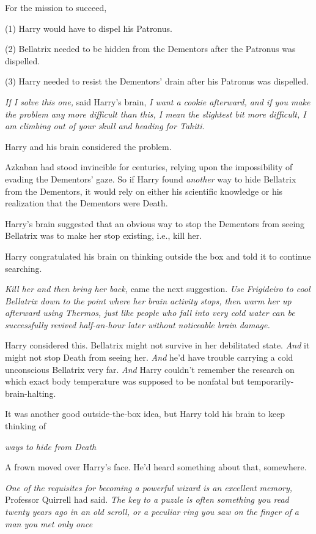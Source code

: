 For the mission to succeed,

(1) Harry would have to dispel his Patronus.

(2) Bellatrix needed to be hidden from the Dementors after the Patronus was
dispelled.

(3) Harry needed to resist the Dementors' drain after his Patronus was
dispelled.

{\el}

\emph{If I solve this one,} said Harry's brain, \emph{I want a cookie
afterward, and if you make the problem any more difficult than this, I mean the
slightest bit more difficult, I am climbing out of your skull and heading for
Tahiti.}

Harry and his brain considered the problem.

Azkaban had stood invincible for centuries, relying upon the impossibility of
evading the Dementors' gaze. So if Harry found \emph{another} way to hide
Bellatrix from the Dementors, it would rely on either his scientific knowledge
or his realization that the Dementors were Death.

Harry's brain suggested that an obvious way to stop the Dementors from seeing
Bellatrix was to make her stop existing, i.e., kill her.

Harry congratulated his brain on thinking outside the box and told it to
continue searching.

\emph{Kill her and then bring her back,} came the next suggestion. \emph{Use
Frigideiro to cool Bellatrix down to the point where her brain activity stops,
then warm her up afterward using Thermos, just like people who fall into very
cold water can be successfully revived half-an-hour later without noticeable
brain damage.}

Harry considered this. Bellatrix might not survive in her debilitated state.
\emph{And} it might not stop Death from seeing her. \emph{And} he'd have
trouble carrying a cold unconscious Bellatrix very far. \emph{And} Harry
couldn't remember the research on which exact body temperature was supposed to
be nonfatal but temporarily-brain-halting.

It was another good outside-the-box idea, but Harry told his brain to keep
thinking of{\el}

\emph{{\el} ways to hide from Death{\el}}

A frown moved over Harry's face. He'd heard something about that, somewhere.

\emph{One of the requisites for becoming a powerful wizard is an excellent
memory,} Professor Quirrell had said. \emph{The key to a puzzle is often
something you read twenty years ago in an old scroll, or a peculiar ring you
saw on the finger of a man you met only once{\el}}

